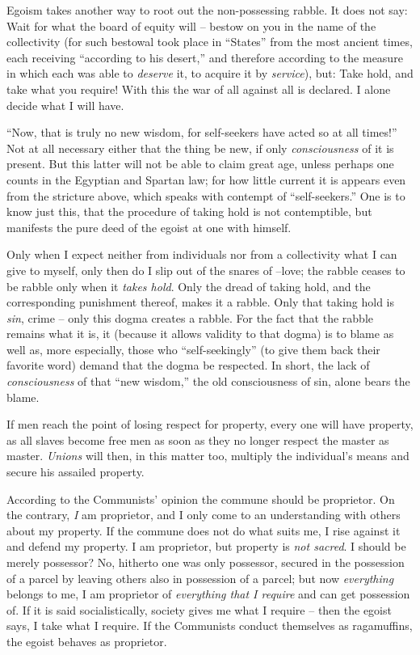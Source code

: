 \documentclass[12pt,a4paper]{book}
\begin{document}
Egoism takes another way to root out the non-possessing rabble. It does not 
say: Wait for what the board of equity will -- bestow on you in the name of 
the collectivity (for such bestowal took place in ``States'' from the most 
ancient times, each receiving ``according to his desert,'' and therefore 
according to the measure in which each was able to \textit{deserve} it, to 
acquire it by \textit{service}), but: Take hold, and take what you require! 
With this the war of all against all is declared. I alone decide what I will 
have.

``Now, that is truly no new wisdom, for self-seekers have acted so at all 
times!'' Not at all necessary either that the thing be new, if only 
\textit{consciousness} of it is present. But this latter will not be able to 
claim great age, unless perhaps one counts in the Egyptian and Spartan law; 
for how little current it is appears even from the stricture above, which 
speaks with contempt of ``self-seekers.'' One is to know just this, that the 
procedure of taking hold is not contemptible, but manifests the pure deed of 
the egoist at one with himself.

Only when I expect neither from individuals nor from a collectivity what I can 
give to myself, only then do I slip out of the snares of --love; the rabble 
ceases to be rabble only when it \textit{takes hold}. Only the dread of taking 
hold, and the corresponding punishment thereof, makes it a rabble. Only that 
taking hold is \textit{sin}, crime -- only this dogma creates a rabble. For 
the fact that the rabble remains what it is, it (because it allows validity to 
that dogma) is to blame as well as, more especially, those who 
``self-seekingly'' (to give them back their favorite word) demand that the 
dogma be respected. In short, the lack of \textit{consciousness} of that 
``new wisdom,'' the old consciousness of sin, alone bears the blame.

If men reach the point of losing respect for property, every one will have 
property, as all slaves become free men as soon as they no longer respect the 
master as master. \textit{Unions} will then, in this matter too, multiply the 
individual's means and secure his assailed property.

According to the Communists' opinion the commune should be proprietor. On the 
contrary, \textit{I} am proprietor, and I only come to an understanding with 
others about my property. If the commune does not do what suits me, I rise 
against it and defend my property. I am proprietor, but property is 
\textit{not sacred}. I should be merely possessor? No, hitherto one was only 
possessor, secured in the possession of a parcel by leaving others also in 
possession of a parcel; but now \textit{everything} belongs to me, I am 
proprietor of \textit{everything that I require} and can get possession of. If 
it is said socialistically, society gives me what I require -- then the egoist 
says, I take what I require. If the Communists conduct themselves as 
ragamuffins, the egoist behaves as proprietor.
\end{document}

